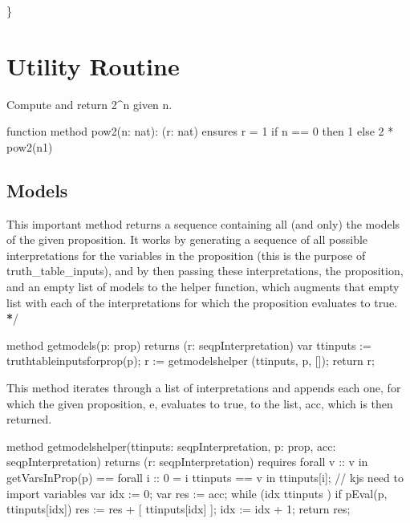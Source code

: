 \documentclass[letterpaper,10pt,english]{sphinxmanual}
\begin{document}
\}


\section{Utility Routine}
\label{\detokenize{12-satisfiability:utility-routine}}
Compute and return 2\textasciicircum{}n given n.

\begin{sphinxVerbatim}[commandchars=\\\{\}]
function method pow2(n: nat): (r: nat)
    ensures r \PYGZgt{}= 1
\PYGZob{}
    if n == 0 then 1 else 2 * pow2(n\PYGZhy{}1)
\PYGZcb{}
\end{sphinxVerbatim}


\subsection{Models}
\label{\detokenize{12-satisfiability:models}}
This important method returns a sequence containing all (and only) the
models of the given proposition. It works by generating a sequence of
all possible interpretations for the variables in the proposition
(this is the purpose of truth\_table\_inputs), and by then passing these
interpretations, the proposition, and an empty list of models to the
helper function, which augments that empty list with each of the
interpretations for which the proposition evaluates to true.  {\color{red}\bfseries{}*}/

\begin{sphinxVerbatim}[commandchars=\\\{\}]
method get\PYGZus{}models(p: prop) returns
    (r: seq\PYGZlt{}pInterpretation\PYGZgt{})
\PYGZob{}
    var tt\PYGZus{}inputs := truth\PYGZus{}table\PYGZus{}inputs\PYGZus{}for\PYGZus{}prop(p);
    r := get\PYGZus{}models\PYGZus{}helper (tt\PYGZus{}inputs, p, []);
    return r;

\PYGZcb{}
\end{sphinxVerbatim}

This method iterates through a list of interpretations and appends
each one, for which the given proposition, e, evaluates to true, to
the list, acc, which is then returned.

\begin{sphinxVerbatim}[commandchars=\\\{\}]
method get\PYGZus{}models\PYGZus{}helper(tt\PYGZus{}inputs: seq\PYGZlt{}pInterpretation\PYGZgt{}, p: prop, acc: seq\PYGZlt{}pInterpretation\PYGZgt{})
     returns (r: seq\PYGZlt{}pInterpretation\PYGZgt{})
     requires forall v :: v in getVarsInProp(p) ==\PYGZgt{}
                 forall i :: 0 \PYGZlt{}= i \PYGZlt{} \textbar{}tt\PYGZus{}inputs\textbar{} ==\PYGZgt{}
                     v in tt\PYGZus{}inputs[i];  // kjs \PYGZhy{}\PYGZhy{} need to import variables
 \PYGZob{}
     var idx := 0;
     var res := acc;
     while (idx \PYGZlt{} \textbar{} tt\PYGZus{}inputs \textbar{})
     \PYGZob{}
         if pEval(p, tt\PYGZus{}inputs[idx])
         \PYGZob{} res := res + [ tt\PYGZus{}inputs[idx] ]; \PYGZcb{}
         idx := idx + 1;
     \PYGZcb{}
     return res;
 \PYGZcb{}
\end{sphinxVerbatim}
\end{document}
